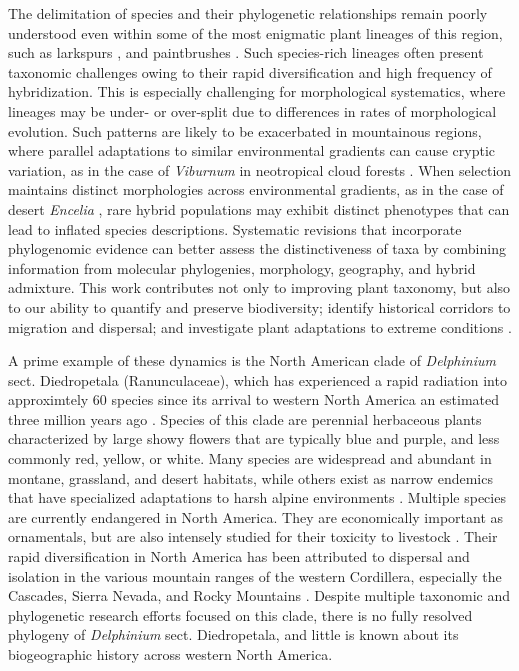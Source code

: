 \documentclass[11pt]{article}
\begin{document}
The delimitation of species and their phylogenetic relationships remain poorly
understood even within some of the most enigmatic plant lineages of this region, 
such as larkspurs \citep{jabbour_phylogeny_2012, xiang_Recircumscription_2017}, 
and paintbrushes \citep{tank_phylogenetic_2009,jacobs_quantifying_2025}.
% 
Such species-rich lineages often present taxonomic challenges owing to their 
rapid diversification and high frequency of hybridization.
% 
This is especially challenging for morphological systematics, where lineages
may be under- or over-split due to differences in rates of morphological evolution.
% 
Such patterns are likely to be exacerbated in mountainous regions, where
parallel adaptations to similar environmental gradients can cause cryptic variation, as in the case of \emph{Viburnum} in neotropical
cloud forests \citep{donoghue_replicated_2022}. 
% 
When selection maintains distinct morphologies across environmental
gradients, as in the case of desert \emph{Encelia} 
\citep{divittorio_natural_2020}, rare hybrid populations may exhibit
distinct phenotypes that can lead to inflated species descriptions.
% 
Systematic revisions that incorporate phylogenomic evidence can better
assess the distinctiveness of taxa by combining information from molecular
phylogenies, morphology, geography, and hybrid admixture.
% 
This work contributes not only to improving plant taxonomy, but also to
our ability to quantify and preserve biodiversity; identify historical 
corridors to migration and dispersal; and investigate plant adaptations
to extreme conditions \citep{anstett_2021, gross_unforeseen_2024, melton_draft_2021}. 


A prime example of these dynamics is the North American clade of \emph{Delphinium} 
sect. Diedropetala (Ranunculaceae), which has experienced a rapid radiation 
into approximtely 60 species since its arrival to western North America an 
estimated three million years ago \citep{jabbour_phylogeny_2012}.
% 
Species of this clade are perennial herbaceous plants characterized by large 
showy flowers that are typically blue and purple, and less commonly red, yellow, 
or white. 
% 
Many species are widespread and abundant in montane, grassland, and desert habitats,
while others exist as narrow endemics that have specialized adaptations to harsh 
alpine environments \citep{warnock_taxonomic_1995}. 
% 
Multiple species are currently endangered in North America. 
They are economically important as ornamentals, but are also intensely studied for 
their toxicity to livestock \citep{cook_2009, cook_two_2017, gardner_taxonomic_2002, pfister_grazing_2014}.
Their rapid diversification in North America has been attributed to dispersal and 
isolation in the various mountain ranges of the western Cordillera, especially the
Cascades, Sierra Nevada, and Rocky Mountains \citep{Warnock_1997}.
% 
Despite multiple taxonomic and phylogenetic research efforts focused on this clade,
there is no fully resolved phylogeny of \emph{Delphinium} sect. Diedropetala,
and little is known about its biogeographic history across western North America.
\end{document}
